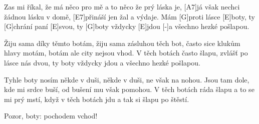 
\sloka
[E7]Zas mi říkal, že má něco pro mě
a to něco že prý láska je,
[A7]já však nechci žádnou lásku v domě,
[E7]přináší jen žal a výdaje.
Mám [G]proti lásce [E]boty,
ty [G]chrání paní [E]svou,
ty [G]boty vždycky [E]jdou
[-]a všechno hezké pošlapou.

\sloka
Žiju sama díky těmto botám,
žiju sama zásluhou těch bot,
často sice klukům hlavy motám,
botám ale city nejsou vhod.
V těch botách často šlapu,
zvlášť po lásce nás dvou,
ty boty vždycky jdou
a všechno hezké pošlapou.

\sloka
Tyhle boty nosím někde v duši,
někde v duši, ne však na nohou.
Jsou tam dole, kde mi srdce buší,
od bušení mu však pomohou.
V těch botách ráda šlapu
a to se mi prý mstí,
když v těch botách jdu
a tak si šlapu po štěstí.

\hvezda
Pozor, boty: pochodem vchod!
